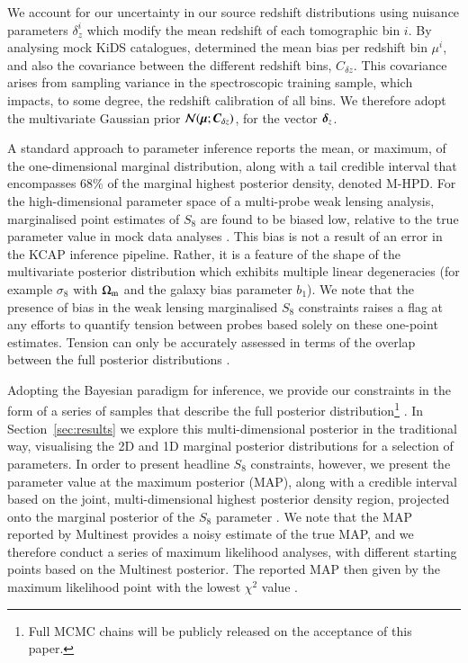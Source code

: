 We account for our uncertainty in our source redshift distributions using nuisance parameters $\delta_z^i$ which modify the mean redshift of each tomographic bin $i$.   By analysing mock KiDS catalogues, \citet{wright/etal:2020} determined the mean bias per redshift bin $\mu^i$, and also the covariance between the different redshift bins, $C_{\delta z}$.   This covariance arises from sampling variance in the spectroscopic training sample, which impacts, to some degree, the redshift calibration of all bins.    We therefore adopt the multivariate Gaussian prior ${\cal N}(\mbox{\boldmath $\mu$};\mbox{\boldmath $C$}_{\delta z})$, for the vector $\mbox{\boldmath $\delta$}_z$. 

A standard approach to parameter inference reports the mean, or maximum, of the one-dimensional marginal distribution, along with a tail credible interval that encompasses 68\% of the marginal highest posterior density, denoted M-HPD.  For the high-dimensional parameter space of a multi-probe weak lensing analysis, marginalised point estimates of $S_8$ are found to be biased low, relative to the true parameter value in mock data analyses \citep{joachimi/etal:inprep}.   This bias is not a result of an error in the {\sc KCAP} inference pipeline.  Rather, it is a feature of the shape of the multivariate posterior distribution which exhibits multiple linear degeneracies (for example $\sigma_8$ with $\Omega_{\rm m}$ and the galaxy bias parameter $b_1$).   We note that the presence of bias in the weak lensing marginalised $S_8$ constraints raises a flag at any efforts to quantify tension between probes based solely on these one-point estimates.  Tension can only be accurately assessed in terms of the overlap between the full posterior distributions \citep[see for example][]{handley/lemos:2019,lemos/etal:2019}.

Adopting the Bayesian paradigm for inference, we provide our constraints in the form of a series of samples that describe the full posterior distribution\footnote{Full MCMC chains will be publicly released on the acceptance of this paper.} .    In Section~\ref{sec:results} we explore this multi-dimensional posterior in the traditional way, visualising the 2D and 1D marginal posterior distributions for a selection of parameters.  In order to present headline $S_8$ constraints, however, we present the parameter value at the maximum posterior (MAP), along with a credible interval based on the joint, multi-dimensional highest posterior density region, projected onto the marginal posterior of the $S_8$ parameter \citep[see section 6.4][for further details on this MAP with PJ-HPD estimator]{joachimi/etal:inprep}.  We note that the MAP reported by {\sc Multinest} provides a noisy estimate of the true MAP, and we therefore conduct a series of  \citet{nelder/mead:1965} maximum likelihood analyses, with different starting points based on the {\sc Multinest} posterior.   The reported MAP then given by the maximum likelihood point with the lowest $\chi^2$ value \citep[see also][who adopt a similar approach]{muir/etal:2020}.



 







